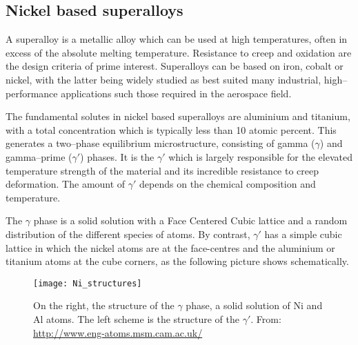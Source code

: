 


\subsection{Nickel based superalloys}
A superalloy is a metallic alloy which can be used at high temperatures, often in excess of the absolute melting temperature. Resistance to creep and oxidation are the design criteria of prime interest. Superalloys can be based on iron, cobalt or nickel, with the latter being widely studied as best suited many industrial, high--performance applications such those required in the aerospace field.

The fundamental solutes in nickel based superalloys are aluminium and titanium, with a total concentration which is typically less than 10 atomic percent. This generates a two--phase equilibrium microstructure, consisting of gamma ($\gamma$) and gamma--prime ($\gamma'$) phases. It is the $\gamma'$ which is largely responsible for the elevated temperature strength of the material and its incredible resistance to creep deformation. The amount of $\gamma'$ depends on the chemical composition and temperature.%

The $\gamma$ phase is a solid solution with a Face Centered Cubic lattice and a random distribution of the different species of atoms. By contrast, $\gamma'$ has a simple cubic lattice in which the nickel atoms are at the face-centres and the aluminium or titanium atoms at the cube corners, as the following picture shows schematically.
\begin{figure}[tb]
    \centering
    \texttt{[image: Ni\_structures]}
    \caption{On the right, the structure of the $\gamma$ phase, a solid solution of Ni and Al atoms. The left scheme is the structure of the $\gamma'$. From: {\ttfamily\url{http://www.eng-atoms.msm.cam.ac.uk/}}}
    \label{fig:Ni_struct}
\end{figure}

